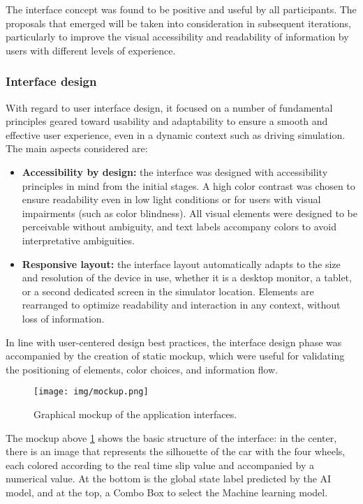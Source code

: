 \documentclass[a4paper,final,12pt]{report}
\begin{document}
The interface concept was found to be positive and useful by all participants. The proposals that emerged will be taken into consideration in subsequent iterations, particularly to improve the visual accessibility and readability of information by users with different levels of experience.

\subsubsection{Interface design}
With regard to user interface design, it focused on a number of fundamental principles geared toward usability and adaptability to ensure a smooth and effective user experience, even in a dynamic context such as driving simulation.\\

The main aspects considered are:
\begin{itemize}
    \item \textbf{Accessibility by design:} the interface was designed with accessibility principles in mind from the initial stages. A high color contrast was chosen to ensure readability even in low light conditions or for users with visual impairments (such as color blindness). All visual elements were designed to be perceivable without ambiguity, and text labels accompany colors to avoid interpretative ambiguities.
    \item \textbf{Responsive layout:} the interface layout automatically adapts to the size and resolution of the device in use, whether it is a desktop monitor, a tablet, or a second dedicated screen in the simulator location. Elements are rearranged to optimize readability and interaction in any context, without loss of information.
\end{itemize}

In line with user-centered design best practices, the interface design phase was accompanied by the creation of static mockup, which were useful for validating the positioning of elements, color choices, and information flow.

\begin{figure}[H]
\centering
\texttt{[image: img/mockup.png]}
\caption{Graphical mockup of the application interfaces.}
\label{fig:mockup}
\end{figure}


The mockup above \ref{fig:mockup} shows the basic structure of the interface: in the center, there is an image that represents the silhouette of the car with the four wheels, each colored according to the real time slip value and accompanied by a numerical value. At the bottom is the global state label predicted by the AI model, and at the top, a Combo Box to select the Machine learning model.
\end{document}
